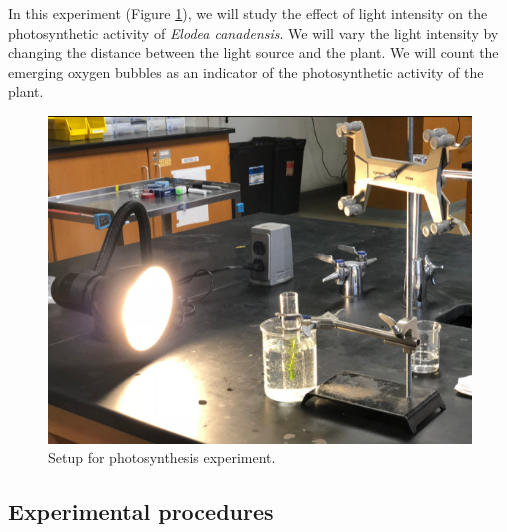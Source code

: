In this experiment (Figure \ref{fig:photosynthesis}), we will study the
effect of light intensity on the photosynthetic activity of \emph{Elodea
canadensis}. We will vary the light intensity by changing the distance
between the light source and the plant. We will count the emerging
oxygen bubbles as an indicator of the photosynthetic activity of the
plant.

\begin{figure}

{\centering \includegraphics[width=0.7\linewidth]{./figures/photosynthesis/photosynthesis}

}

\caption{Setup for photosynthesis experiment.}\label{fig:photosynthesis}
\end{figure}

\subsection{Experimental procedures}\label{experimental-procedures-21}

